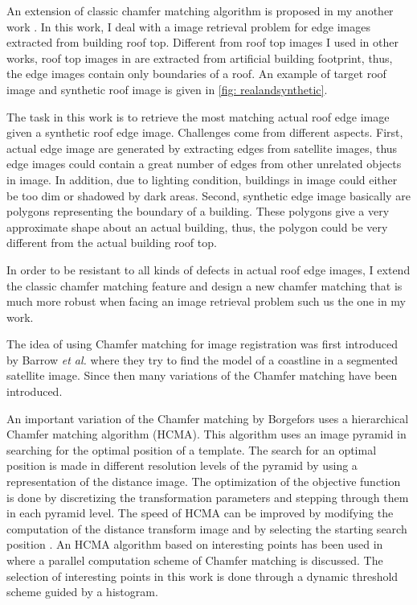 \documentclass{iitthesis}
\begin{document}
 An extension of classic chamfer matching algorithm is proposed in my another work \cite{ZX14}. In this work, I deal with a image retrieval problem for edge images extracted from building roof top. Different from roof top images I used in other works, roof top images in \cite{ZX14} are extracted from artificial building footprint, thus, the edge images contain only boundaries of a roof. An example of target roof image and synthetic roof image is given in \ref{fig: realandsynthetic}.

The task in this work is to retrieve the most matching actual roof edge image given a synthetic roof edge image. Challenges come from different aspects. First, actual edge image are generated by extracting edges from satellite images, thus edge images could contain a great number of edges from other unrelated objects in image. In addition, due to lighting condition, buildings in image could either be too dim or shadowed by dark areas. Second, synthetic edge image basically are polygons representing the boundary of a building. These polygons give a very approximate shape about an actual building, thus, the polygon could be very different from the actual building roof top.

In order to be resistant to all kinds of defects in actual roof edge images, I extend the classic chamfer matching feature and design a new chamfer matching that is much more robust when facing an image retrieval problem such us the one in my work.

The idea of using Chamfer matching for image registration was first introduced by Barrow \textit{et al.} \cite{HB:77} where they try to find the model of a coastline in a segmented satellite image. Since then many variations of the Chamfer matching have been introduced.

An important variation of the Chamfer matching by Borgefors \cite{GB:88} uses a hierarchical Chamfer matching algorithm (HCMA). This algorithm uses an image pyramid in searching for the optimal position of a template. The search for an optimal position is made in different resolution levels of the pyramid by using a representation of the distance image. The optimization of the objective function is done by discretizing the transformation parameters and stepping through them in each pyramid level. The speed of HCMA can be improved by modifying the computation of the distance transform image and by selecting the starting search position \cite{QZ:09}. An HCMA algorithm based on interesting points has been used in \cite{JY:95} where a parallel computation scheme of Chamfer matching is discussed. The selection of interesting points in this work is done through a dynamic threshold scheme guided by a histogram.
\end{document}
